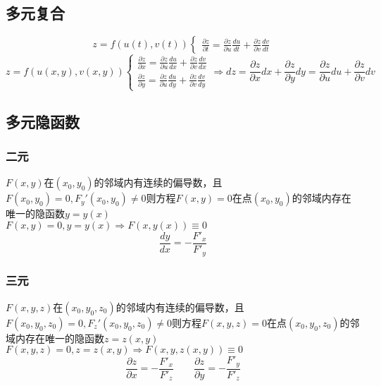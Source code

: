 \subsection{多元复合}
$$z=f(u(t),v(t))\begin{cases}
	\frac{\partial z}{\partial t}=\frac{\partial z}{\partial u}\frac{du}{dt}+\frac{\partial z}{\partial v}\frac{dv}{dt}
\end{cases}$$
$$z=f(u(x,y),v(x,y))\begin{cases}
	\frac{\partial z}{\partial x}=\frac{\partial z}{\partial u}\frac{du}{dx}+\frac{\partial z}{\partial v}\frac{dv}{dx}\\
	\frac{\partial z}{\partial y}=\frac{\partial z}{\partial u}\frac{du}{dy}+\frac{\partial z}{\partial v}\frac{dv}{dy}
\end{cases}\Rightarrow dz=\frac{\partial z}{\partial x}dx+\frac{\partial z}{\partial y}dy=\frac{\partial z}{\partial u}du+\frac{\partial z}{\partial v}dv$$
\subsection{多元隐函数}
\subsubsection{二元}
$F(x,y)$在$(x_0,y_0)$的邻域内有连续的偏导数，且$F(x_0,y_0)=0,F_y'(x_0,y_0)\neq 0$则方程$F(x,y)=0$在点$(x_0,y_0)$的邻域内存在唯一的隐函数$y=y(x)$\\
$F(x,y)=0,y=y(x)\Rightarrow F(x,y(x))\equiv0$
$$\frac{dy}{dx}=-\frac{F'_x}{F'_y}$$
\subsubsection{三元}
$F(x,y,z)$在$(x_0,y_0,z_0)$的邻域内有连续的偏导数，且$F(x_0,y_0,z_0)=0,F_z'(x_0,y_0,z_0)\neq 0$则方程$F(x,y,z)=0$在点$(x_0,y_0,z_0)$的邻域内存在唯一的隐函数$z=z(x,y)$\\
$F(x,y,z)=0,z=z(x,y)\Rightarrow F(x,y,z(x,y))\equiv0$
$$\frac{\partial z}{\partial x}=-\frac{F'_x}{F'_z}\qquad\frac{\partial z}{\partial y}=-\frac{F'_y}{F'_z}$$
